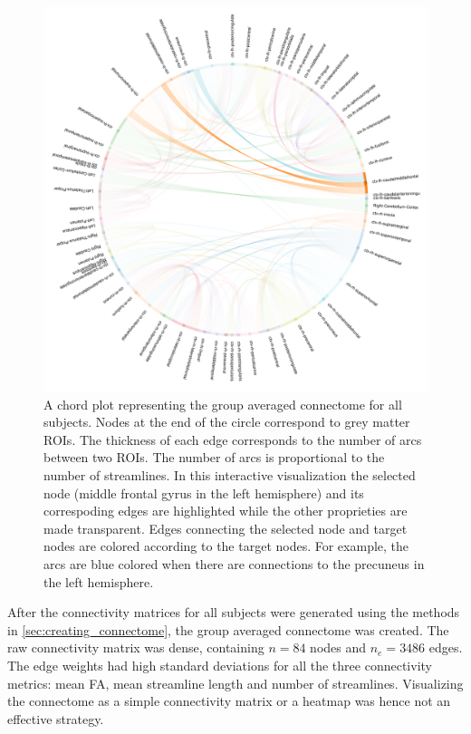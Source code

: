 \documentclass[msthesis.tex]{subfiles}
\begin{document}
\begin{figure}
    \centering
    \includegraphics[width=\textwidth]{images/selected_view_all.png}
    \caption{A chord plot representing the group averaged connectome for all subjects. Nodes at the end of the circle correspond to grey matter \gls{ROI}s. The thickness of each edge corresponds to the number of arcs between two \gls{ROI}s. The number of arcs is proportional to the number of streamlines. In this interactive visualization the selected node (middle frontal gyrus in the left hemisphere) and its correspoding edges are highlighted while the other proprieties are made transparent. Edges connecting the selected node and target nodes are colored according to the target nodes. For example, the arcs are blue colored when there are connections to the precuneus in the left hemisphere.}
    \label{fig:connectome_num_streamlines}
\end{figure}

After the connectivity matrices for all subjects were generated using the methods in \autoref{sec:creating_connectome}, the group averaged connectome was created. The raw connectivity matrix was dense, containing $n = 84$ nodes and $n_e = 3486$ edges. The edge weights had high standard deviations for all the three connectivity metrics: mean FA, mean streamline length and number of streamlines. Visualizing the connectome as a simple connectivity matrix or a heatmap was hence not an effective strategy.
\end{document}
